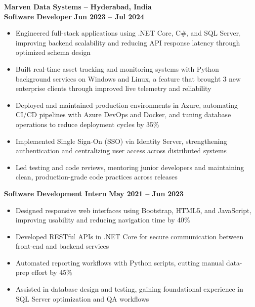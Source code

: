 \documentclass[a4paper,10pt]{article}
\begin{document}
\textbf{Marven Data Systems – Hyderabad, India} \\[3.75pt]
\textbf{Software Developer} \hfill \textbf{Jun 2023 – Jul 2024} \\[3.75pt]
\begin{minipage}[t]{\linewidth}
\begin{itemize}[nosep,after=\strut, leftmargin=1em, itemsep=3pt,label=$\bullet$]
\item Engineered full-stack applications using .NET Core, C\#, and SQL Server, improving backend scalability and reducing API response latency through optimized schema design
\item Built real-time asset tracking and monitoring systems with Python background services on Windows and Linux, a feature that brought 3 new enterprise clients through improved live telemetry and reliability
\item Deployed and maintained production environments in Azure, automating CI/CD pipelines with Azure DevOps and Docker, and tuning database operations to reduce deployment cycles by 35\%
\item Implemented Single Sign-On (SSO) via Identity Server, strengthening authentication and centralizing user access across distributed systems
\item Led testing and code reviews, mentoring junior developers and maintaining clean, production-grade code practices across releases
\end{itemize}
\end{minipage}

\textbf{Software Development Intern} \hfill \textbf{May 2021 – Jun 2023} \\[3.75pt]
\begin{minipage}[t]{\linewidth}
\begin{itemize}[nosep,after=\strut, leftmargin=1em, itemsep=3pt,label=$\bullet$]
\item Designed responsive web interfaces using Bootstrap, HTML5, and JavaScript, improving usability and reducing navigation time by 40\%
\item Developed RESTful APIs in .NET Core for secure communication between front-end and backend services
\item Automated reporting workflows with Python scripts, cutting manual data-prep effort by 45\%
\item Assisted in database design and testing, gaining foundational experience in SQL Server optimization and QA workflows
\end{itemize}
\end{minipage}
  
\end{document}
